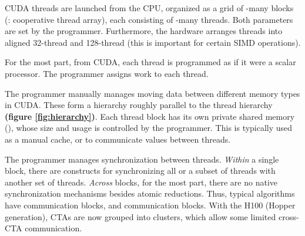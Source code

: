 \begin{figure*}[!b]
\caption{CUDA thread and memory hierarchy} \label{fig:hierarchy}
\end{figure*}

\filbreak
{} CUDA threads are launched from the CPU, organized as a grid of -many blocks (: cooperative thread array), each consisting of -many threads.
Both parameters are set by the programmer.
Furthermore, the hardware arranges threads into aligned 32-thread  and 128-thread  (this is important for certain SIMD operations).

\filbreak
{} For the most part, from CUDA, each thread is programmed as if it were a scalar processor.
The programmer assigns work to each thread.

\filbreak
{} The programmer manually manages moving data between different memory types in CUDA.
These form a hierarchy roughly parallel to the thread hierarchy \textbf{(figure \ref{fig:hierarchy})}.
Each thread block has its own private shared memory (), whose size and usage is controlled by the programmer.
This is typically used as a manual cache, or to communicate values between threads.

\filbreak
{}
  The programmer manages synchronization between threads.
  \textit{Within} a single block, there are constructs for synchronizing all or a subset of threads with another set of threads.
  \textit{Across} blocks, for the most part, there are no native synchronization mechanisms besides atomic reductions.
  Thus, typical algorithms have  communication  blocks, and  communication  blocks.
  With the H100 (Hopper generation), CTAs are now grouped into clusters, which allow some limited cross-CTA communication.

